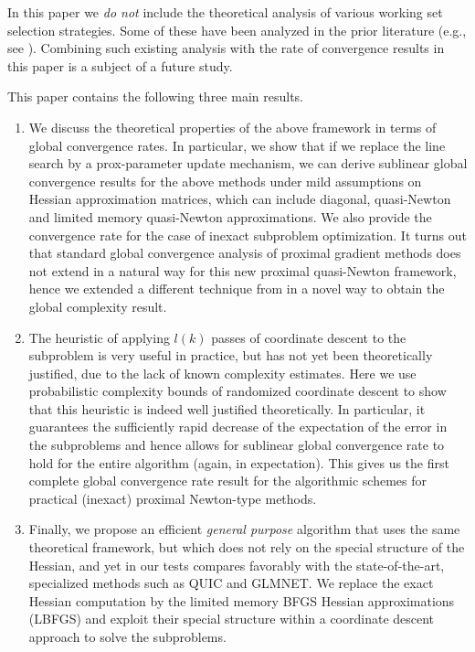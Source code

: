 \documentclass[11pt]{article}
\numberwithin{equation}{section}
\begin{document}
In this paper we {\em do not } include the theoretical analysis of various working set selection strategies. Some of these have been analyzed in the prior literature (e.g., see \cite{LewisWright11}). Combining such existing analysis with the rate of convergence results in this paper is a subject of a future study. 

This paper contains the following  three main results. 
\begin{enumerate}
\item We discuss the  theoretical properties of the above framework in terms of global convergence rates.
In particular, we show that if we replace the line search by a prox-parameter update mechanism, we can derive sublinear global convergence results for the above methods under mild assumptions on Hessian approximation matrices, which can include diagonal, quasi-Newton and limited memory quasi-Newton approximations. We also provide the convergence rate for the case of inexact subproblem optimization. 
It turns out that standard global convergence analysis of proximal gradient methods does not extend in a natural way for this new proximal
quasi-Newton framework, hence we extended a different technique from \cite{Cartisetal2012}  in a novel way to obtain the global complexity result.

\item The heuristic of applying $l(k)$ passes of coordinate descent to the subproblem is very useful in practice, but has not yet been theoretically justified, due to the lack of known complexity estimates. Here we use probabilistic complexity bounds of randomized coordinate descent to show that this heuristic is indeed  well justified theoretically.
In particular, it guarantees the sufficiently rapid decrease of the expectation of the error in the subproblems  and hence allows for sublinear global convergence rate to hold for the entire algorithm (again, in expectation). This gives us the  first complete global convergence rate result for the algorithmic schemes for  practical (inexact) proximal Newton-type methods. 
\item
Finally, we propose an efficient {\em general purpose} algorithm that uses the same theoretical framework, but  which does not rely on the special structure of the Hessian, and yet in our tests compares favorably with the state-of-the-art, specialized methods such as   QUIC and GLMNET. We replace the exact Hessian computation by the limited memory BFGS Hessian approximations  \cite{NoceWrig06}  (LBFGS) and exploit their special structure within a coordinate descent approach to solve the subproblems.
\end{enumerate}
\end{document}
